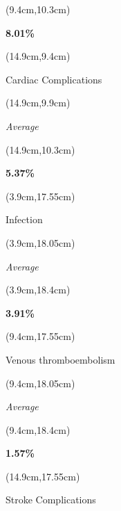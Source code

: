 \documentclass[
  11pt,
  landscape]{article}
\begin{document}
\begin{textblock*}{5cm}(9.4cm,10.3cm) %
    \centerline{\textbf{8.01\%}}
\end{textblock*}

\begin{textblock*}{5cm}(14.9cm,9.4cm) %
    \centerline{\small{Cardiac Complications}}
\end{textblock*}

\begin{textblock*}{5cm}(14.9cm,9.9cm) %
    \small \centerline{\textit{Average}}
\end{textblock*}

\begin{textblock*}{5cm}(14.9cm,10.3cm) %
    \centerline{\textbf{5.37\%}}
\end{textblock*}

\begin{textblock*}{5cm}(3.9cm,17.55cm) %
    \centerline{\small{Infection}}
\end{textblock*}

\begin{textblock*}{5cm}(3.9cm,18.05cm) %
    \small \centerline{\textit{Average}}
\end{textblock*}

\begin{textblock*}{5cm}(3.9cm,18.4cm) %
    \centerline{\textbf{3.91\%}}
\end{textblock*}

\begin{textblock*}{5cm}(9.4cm,17.55cm) %
    \centerline{\small{Venous thromboembolism}}
\end{textblock*}

\begin{textblock*}{5cm}(9.4cm,18.05cm) %
    \small \centerline{\textit{Average}}
\end{textblock*}

\begin{textblock*}{5cm}(9.4cm,18.4cm) %
    \centerline{\textbf{1.57\%}}
\end{textblock*}

\begin{textblock*}{5cm}(14.9cm,17.55cm) %
    \centerline{\small{Stroke Complications}}
\end{textblock*}
\end{document}
